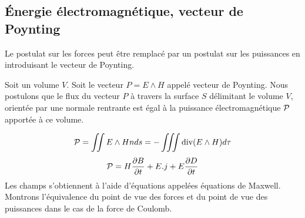 \documentclass[12pt]{book}
\begin{document}
\subsection{\'Energie \'electromagn\'etique, vecteur de
Poynting}\label{secenergemag}
Le postulat sur les forces peut \^etre remplac\'e par un postulat sur
les puissances en introduisant le vecteur de Poynting.
\begin{postulat}
Soit un volume $V$. Soit le vecteur $P=E\wedge H$ appel\'e vecteur de
Poynting. Nous postulons que le flux du vecteur $P$ \`a travers la
surface $S$ d\'elimitant le volume $V$, orient\'ee par une normale
rentrante est \'egal \`a la puissance \'electromagn\'etique ${\cal
P}$ apport\'ee \`a ce volume. 
\end{postulat}
\begin{equation}
{\cal P}=\intt E\wedge H n ds =-\inttt \dive (E\wedge H)d\tau
\end{equation}
\begin{equation}
{\cal P}=H\frac{\partial B}{\partial t}+E.j+E\frac{\partial
D}{\partial t}
\end{equation}
Les champs s'obtiennent \`a l'aide d'\'equations appel\'ees
\'equations de Maxwell. Montrons l'\'equivalence du point de vue des
forces et du point de vue des puissances dans le cas de la force de
Coulomb.
\end{document}
